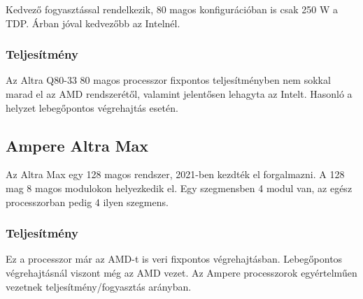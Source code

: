 Kedvező fogyasztással rendelkezik, 80 magos konfigurációban is csak 250 W a TDP.
Árban jóval kedvezőbb az Intelnél.

\subsubsection{Teljesítmény}
Az Altra Q80-33 80 magos processzor fixpontos teljesítményben nem sokkal marad el az AMD rendszerétől, valamint jelentősen lehagyta az Intelt.
Hasonló a helyzet lebegőpontos végrehajtás esetén.

\subsection{Ampere Altra Max}
Az Altra Max egy 128 magos rendszer, 2021-ben kezdték el forgalmazni.
A 128 mag 8 magos modulokon helyezkedik el.
Egy szegmensben 4 modul van, az egész processzorban pedig 4 ilyen szegmens.

\subsubsection{Teljesítmény}
Ez a processzor már az AMD-t is veri fixpontos végrehajtásban.
Lebegőpontos végrehajtásnál viszont még az AMD vezet.
Az Ampere processzorok egyértelműen vezetnek teljesítmény/fogyasztás arányban.